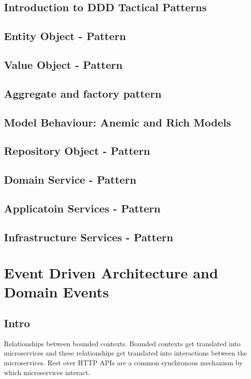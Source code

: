 \documentclass[a4paper, 11pt]{book}
\begin{document}
{    \section{Introduction to DDD Tactical Patterns}


    \section{Entity Object - Pattern}


    \section{Value Object - Pattern}


    \section{Aggregate and factory pattern}


    \section{Model Behaviour: Anemic and Rich Models}


    \section{Repository Object - Pattern}


    \section{Domain Service - Pattern}


    \section{Applicatoin Services - Pattern}


    \section{Infrastructure Services - Pattern}


    \chapter{Event Driven Architecture and Domain Events}
    \section{Intro}
    Relationships between bounded contexts.
    Bounded contexts get translated into microservices and these relationships get translated into interactions between the microservices.
    Rest over HTTP APIs are a common synchronous mechanism by which microservices interact.

}
\end{document}
